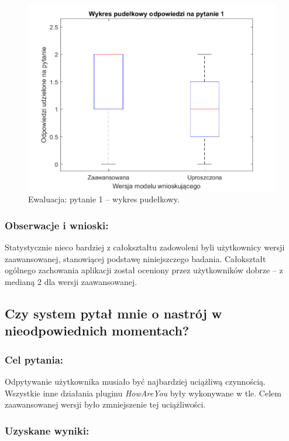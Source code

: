 	\begin{figure}[H]
		\centering
		\includegraphics[scale=0.8]{rozdzial5/Ewaluacja1.png}
		\caption{Ewaluacja: pytanie 1 -- wykres pudełkowy.}
	\end{figure}
	
	\subsubsection{Obserwacje i wnioski:}
	
	Statystycznie nieco bardziej z całokształtu zadowoleni byli użytkownicy wersji zaawansowanej, stanowiącej podstawę niniejszczego badania. Całokształt ogólnego zachowania aplikacji został oceniony przez użytkowników dobrze -- z medianą 2 dla wersji zaawansowanej.


\subsection{Czy system pytał mnie o nastrój w nieodpowiednich momentach?}

	\subsubsection{Cel pytania:}
	
	Odpytywanie użytkownika musiało być najbardziej uciążliwą czynnością. Wszystkie inne działania pluginu \textit{HowAreYou} były wykonywane w tle. Celem zaawansowanej wersji było zmniejszenie tej uciążliwości.
	
	\subsubsection{Uzyskane wyniki:}
	
